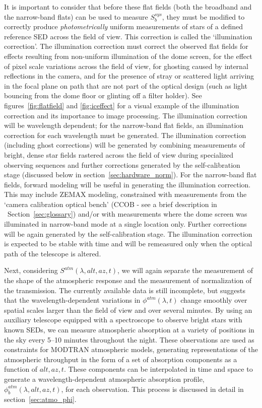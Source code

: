 \documentclass[12pt,preprint]{aastex}
\begin{document}
It is important to consider that before these flat fields (both the
broadband and the narrow-band flats) can be used to measure
$S_b^{sys}$, they must be modified to correctly produce {\it
photometrically} uniform measurements of stars of a defined reference
SED across the field of view. This correction is called the
`illumination correction'.  The illumination correction must correct
the observed flat fields for effects resulting from non-uniform
illumination of the dome screen, for the effect of pixel scale
variations across the field of view, for ghosting caused by internal
reflections in the camera, and for the presence of stray or scattered
light arriving in the focal plane on path that are not part of the
optical design (such as light bouncing from the dome floor or glinting
off a filter holder). See figures~\ref{fig:flatfield} and
\ref{fig:iceffect} for a visual example of the illumination correction
and its importance to image processing. The illumination correction
will be wavelength dependent; for the narrow-band flat fields, an
illumination correction for each wavelength must be generated.  The
illumination correction (including ghost corrections) will be
generated by combining measurements of bright, dense star fields
rastered across the field of view during specialized observing
sequences and further corrections generated by the self-calibration
stage (discussed below in section~\ref{sec:hardware_norm}). For the
narrow-band flat fields, forward modeling will be useful in generating
the illumination correction. This may include ZEMAX modeling,
constrained with measurements from the `camera calibration optical
bench' (CCOB - see a brief description in ~Section~\ref{sec:glossary})
and/or with measurements where the dome screen was illuminated in
narrow-band mode at a single location only.  Further corrections will
be again generated by the self-calibration stage.  The illumination correction is
expected to be stable with time and will be remeasured only when the
optical path of the telescope is altered.

Next, considering $S^{atm}(\lambda,alt,az,t)$, we will again separate
the measurement of the shape of the atmospheric response and the
measurement of normalization of the transmission.  The currently
available data is still incomplete, but suggests that the
wavelength-dependent variations in $\phi^{atm}(\lambda,t)$ change
smoothly over spatial scales larger than the field of view and over
several minutes.  By using an auxiliary telescope equipped with a
spectroscope to observe bright stars with known SEDs, we can measure
atmospheric absorption at a variety of positions in the sky every
5--10 minutes throughout the night. These observations are used as
constraints for MODTRAN atmospheric models, generating representations
of the atmospheric throughput in the form of a set of absorption
components as a function of $alt,az,t$. These components can be
interpolated in time and space to generate a wavelength-dependent
atmospheric absorption profile, $\phi_b^{atm}(\lambda,alt,az,t)$, for
each observation. This process is discussed in detail in
section~\ref{sec:atmo_phi}.  
\end{document}

